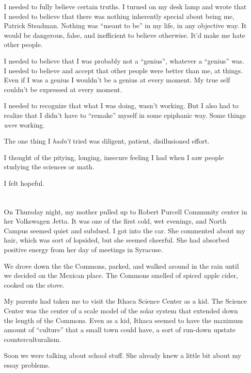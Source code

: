 I needed to fully believe certain truths.  I turned on my desk lamp and wrote
that I needed to believe that there was nothing inherently special about being
me, Patrick Steadman.  Nothing was ``meant to be'' in my life, in any objective
way.  It would be dangerous, false, and inefficient to believe otherwise.  It'd
make me hate other people.

I needed to believe that I was probably not a ``genius'', whatever a ``genius''
was.  I needed to believe and accept that other people were better than me, at
things.  Even if I was a genius I wouldn't be a genius at every moment.  My true
self couldn't be expressed at every moment.  

I needed to recognize that what I was doing, wasn't working.  But I also had to
realize that I didn't have to ``remake'' myself in some epiphanic way.  Some
things \textit{were} working.  

The one thing I \textit{hadn't} tried was diligent, patient, disillusioned
effort.

I thought of the pitying, longing, insecure feeling I had when I saw people
studying the sciences or math.  

I felt hopeful.  

\section{}

On Thursday night, my mother pulled up to Robert Purcell Community center in her
Volkswagen Jetta.  It was one of the first cold, wet evenings, and North Campus
seemed quiet and subdued.  I got into the car.  She commented about my hair,
which was sort of lopsided, but she seemed cheerful.  She had absorbed positive
energy from her day of meetings in Syracuse.  

We drove down the the Commons, parked, and walked around in the rain until we
decided on the Mexican place.  The Commons smelled of spiced apple cider, cooked
on the stove.  

My parents had taken me to visit the Ithaca Science Center as a kid.  The
Science Center was the center of a scale model of the solar system that extended
down the length of the Commons.  Even as a kid, Ithaca seemed to have the
maximum amount of ``culture'' that a small town could have, a sort of run-down
upstate counterculturalism.

Soon we were talking about school stuff.  She already knew a little bit about my
essay problems.

